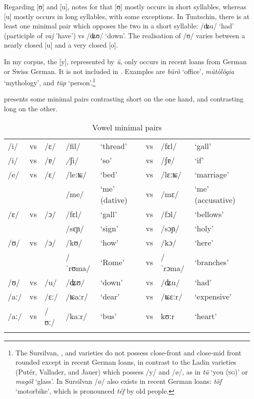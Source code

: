 Regarding [ʊ] and [u], \citet[130]{Liver2010} notes for  that [ʊ] mostly occurs in short syllables, whereas [u] mostly occurs in long syllables, with some exceptions. In Tuatschin, there is at least one minimal pair which opposes the two  in a short syllable: /ʥu/ `had' (participle of \textit{vaj} 'have') vs /ʥʊ/ `down'. The realisation of /ʊ/ varies between a nearly closed [u] and a very closed [o].

In my corpus, the  [y], represented by \textit{ü}, only occurs in recent loans from German or Swiss German. It is not included in . Examples are \textit{bürò} `office', \textit{mütòlògia} `mythology', and \textit{tüp} `person'.\footnote{The Sursilvan, , and  varieties do not possess close-front and close-mid front rounded  except in recent German loans, in contrast to the Ladin varieties (Putér, Vallader, and Jauer) which possess /y/ and /ø/, as in \textit{tü} `you (\textsc{sg})' or \textit{magöl} `glass'. In Sursilvan /ø/ also exists in recent German loans: \textit{töf} `motorbike', which is pronounced \textit{téf} by old people.}

 presents some minimal pairs contrasting short  on the one hand, and contrasting long  on the other.

\begin{table}
	\caption{Vowel minimal pairs}
	\label{vmp}
	\begin{tabular}{llllllll}
	 \lsptoprule
		/i/&vs&/ɛ/& /fil/ &`thread' &vs& /fɛl/&`gall'\\
		/i/ & vs & /ɐ/ & \textit/ʃi/ & `so' & vs & /ʃɐ/ & `if'\\
		/e/&vs&/ɛ/& /leːʨ/ &`bed'&vs& /lɛːʨ/ &`marriage'\\
		&&&/me/ &`me' (dative) & vs & /mɛ/ & `me' (accusative) \\
		/ɛ/&vs&/ɔ/& /fɛl/ &`gall’ &vs & /fɔl/ & `bellows’\\
		&&& /sɛɲ/ &`sign’ & vs & /sɔɲ/ & `holy’\\
	
		/ʊ/ & vs & /ɔ/ & /kʊ/ & `how’ &vs& /kɔ/ &`here’\\
	&&&  /ˈrʊma/ & `Rome' &vs & /ˈrɔma/ & `branches'\\
	/ʊ/ & vs & /u/ &  /ʥʊ/ & `down' & vs & /ʥu/ & `had'\\
		/aː/ & vs & /ɛː/ &  /ʨaːr/ & `dear' & vs & /ʨɛːr/ & `expensive'\\
	/aː/ & vs & /ʊː/ & /kaːr/  & `bus' & vs & kʊːr & `heart'\\
		\lspbottomrule
	\end{tabular}
\end{table}


